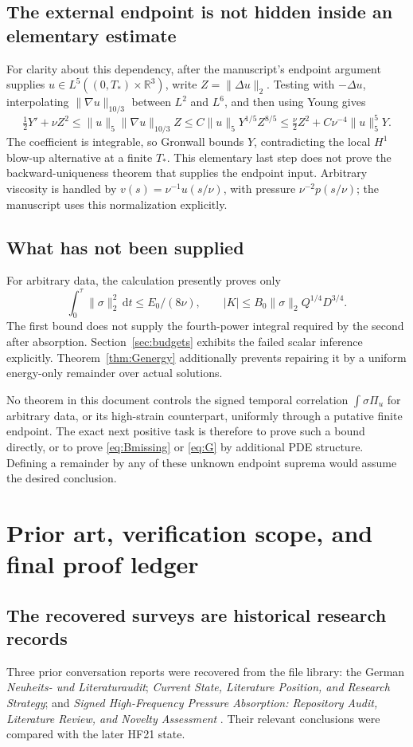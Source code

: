 \documentclass[11pt,a4paper]{article}
\theoremstyle{definition}
\theoremstyle{remark}
\newcommand{\R}{\mathbb R}
\newcommand{\dd}{\,\mathrm d}
\newcommand{\norm}[1]{\lVert #1\rVert}
\numberwithin{equation}{section}
\begin{document}
\subsection{The external endpoint is not hidden inside an elementary estimate}
For clarity about this dependency, after the manuscript's endpoint argument supplies \(u\in L^5((0,T_*)\times\R^3)\), write \(Z=\norm{\Delta u}_2\). Testing with \(-\Delta u\), interpolating \(\norm{\nabla u}_{10/3}\) between \(L^2\) and \(L^6\), and then using Young gives
\[
\tfrac12Y'+\nu Z^2
\le\norm u_5\norm{\nabla u}_{10/3}Z
\le C\norm u_5Y^{1/5}Z^{8/5}
\le\tfrac\nu2Z^2+C\nu^{-4}\norm u_5^5Y.
\]
The coefficient is integrable, so Gronwall bounds \(Y\), contradicting the local \(H^1\) blow-up alternative at a finite \(T_*\). This elementary last step does not prove the backward-uniqueness theorem that supplies the endpoint input. Arbitrary viscosity is handled by \(v(s)=\nu^{-1}u(s/\nu)\), with pressure \(\nu^{-2}p(s/\nu)\); the manuscript uses this normalization explicitly.

\subsection{What has not been supplied}
For arbitrary data, the calculation presently proves only
\[
\int_0^\tau\norm\sigma_2^2\dd t\le E_0/(8\nu),
\qquad
|K|\le B_0\norm\sigma_2Q^{1/4}D^{3/4}.
\]
The first bound does not supply the fourth-power integral required by the second after absorption. Section~\ref{sec:budgets} exhibits the failed scalar inference explicitly. Theorem~\ref{thm:Genergy} additionally prevents repairing it by a uniform energy-only remainder over actual solutions.

No theorem in this document controls the signed temporal correlation \(\int\sigma\Pi_u\) for arbitrary data, or its high-strain counterpart, uniformly through a putative finite endpoint. The exact next positive task is therefore to prove such a bound directly, or to prove \eqref{eq:Bmissing} or \eqref{eq:G} by additional PDE structure. Defining a remainder by any of these unknown endpoint suprema would assume the desired conclusion.

\section{Prior art, verification scope, and final proof ledger}\label{sec:literature}
\subsection{The recovered surveys are historical research records}
Three prior conversation reports were recovered from the file library: the German \emph{Neuheits- und Literaturaudit}; \emph{Current State, Literature Position, and Research Strategy}; and \emph{Signed High-Frequency Pressure Absorption: Repository Audit, Literature Review, and Novelty Assessment} \cite{Survey1,Survey2,Survey3}. Their relevant conclusions were compared with the later HF21 state.
\end{document}
